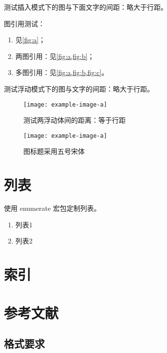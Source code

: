 \documentclass{swputhesis}
\begin{document}
测试插入模式下的图与下面文字的间距：略大于行距。

图引用测试：

\begin{enumerate}
	\item	见\cref{fig:a}；
	\item 两图引用：见\cref{fig:a,fig:b}；
	\item 多图引用：见\cref{fig:a,fig:b,fig:c}。
\end{enumerate}

\clearpage

测试浮动模式下的图与文字的间距：略大于行距。

\begin{figure}[t]
	\centering
	\texttt{[image: example-image-a]}
	\caption{测试两浮动体间的距离：等于行距}
	\label{fig:b}
\end{figure}

\begin{figure}[t]
	\centering
	\texttt{[image: example-image-a]}
	\caption{图标题采用五号宋体}
	\label{fig:c}
\end{figure}

\section{列表}

使用 \textsf{enumerate} 宏包定制列表。

\begin{enumerate}
	\item 列表1
	\item 列表2
\end{enumerate}

\section{索引}


\section{参考文献}

\subsection{格式要求}
\end{document}
